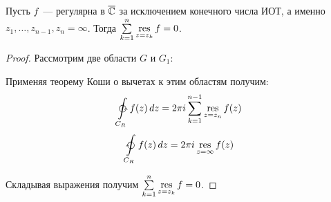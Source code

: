 \begin{corollary}
Пусть \(f\)~--- регулярна в \(\overline{\mathbb{C}}\) за исключением конечного числа ИОТ, а именно \(z_1, \dots, 
z_{n-1}, z_n = \infty\). Тогда \(\sum\limits_{k = 1}^n \operatorname*{res}\limits_{z = z_k} f = 0\).
\end{corollary}

\begin{proof}
    Рассмотрим две области \(G\) и \(G_1\):

\noindent
\begin{minipage}[c]{0.4\textwidth}
\centering
{}
\end{minipage}%
\hfill
\begin{minipage}[c]{0.52\textwidth}
    Применяя теорему Коши о вычетах к этим областям получим:
    \[\ointctrclockwise\limits_{C_R} f(z) \, dz = 2 \pi i \sum\limits_{k = 1}^{n-1} 
    \res\limits_{z = z_n} f(z)\]
    \[\ointclockwise\limits_{C_R} f(z) \, dz = 2 \pi i \res\limits_{z = \infty} f(z)\]

    Складывая выражения получим \(\sum\limits_{k = 1}^n \operatorname*{res}\limits_{z = z_k} f = 0\).
\end{minipage}
\end{proof}



